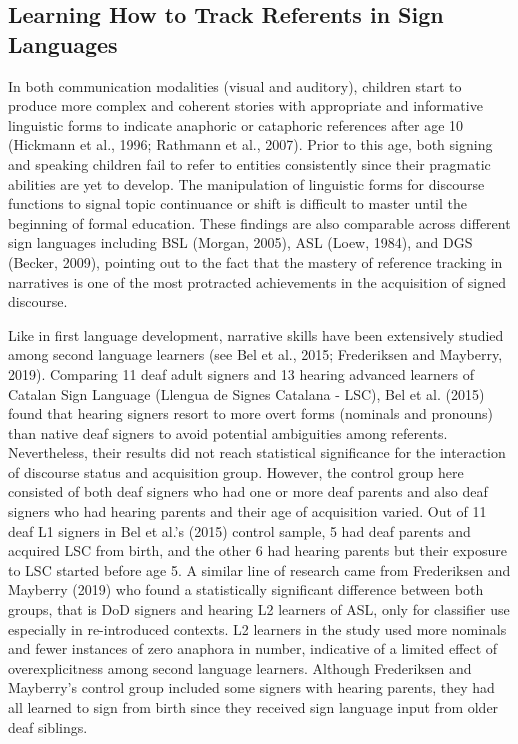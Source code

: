 \documentclass[]{elsarticle} %
\begin{document}
\hypertarget{learning-how-to-track-referents-in-sign-languages}{%
\subsection{Learning How to Track Referents in Sign
Languages}\label{learning-how-to-track-referents-in-sign-languages}}

In both communication modalities (visual and auditory), children start
to produce more complex and coherent stories with appropriate and
informative linguistic forms to indicate anaphoric or cataphoric
references after age 10 (Hickmann et al., 1996; Rathmann et al., 2007).
Prior to this age, both signing and speaking children fail to refer to
entities consistently since their pragmatic abilities are yet to
develop. The manipulation of linguistic forms for discourse functions to
signal topic continuance or shift is difficult to master until the
beginning of formal education. These findings are also comparable across
different sign languages including BSL (Morgan, 2005), ASL (Loew, 1984),
and DGS (Becker, 2009), pointing out to the fact that the mastery of
reference tracking in narratives is one of the most protracted
achievements in the acquisition of signed discourse.

Like in first language development, narrative skills have been
extensively studied among second language learners (see Bel et al.,
2015; Frederiksen and Mayberry, 2019). Comparing 11 deaf adult signers
and 13 hearing advanced learners of Catalan Sign Language (Llengua de
Signes Catalana - LSC), Bel et al. (2015) found that hearing signers
resort to more overt forms (nominals and pronouns) than native deaf
signers to avoid potential ambiguities among referents. Nevertheless,
their results did not reach statistical significance for the interaction
of discourse status and acquisition group. However, the control group
here consisted of both deaf signers who had one or more deaf parents and
also deaf signers who had hearing parents and their age of acquisition
varied. Out of 11 deaf L1 signers in Bel et al.'s (2015) control sample,
5 had deaf parents and acquired LSC from birth, and the other 6 had
hearing parents but their exposure to LSC started before age 5. A
similar line of research came from Frederiksen and Mayberry (2019) who
found a statistically significant difference between both groups, that
is DoD signers and hearing L2 learners of ASL, only for classifier use
especially in re-introduced contexts. L2 learners in the study used more
nominals and fewer instances of zero anaphora in number, indicative of a
limited effect of overexplicitness among second language learners.
Although Frederiksen and Mayberry's control group included some signers
with hearing parents, they had all learned to sign from birth since they
received sign language input from older deaf siblings.
\end{document}
